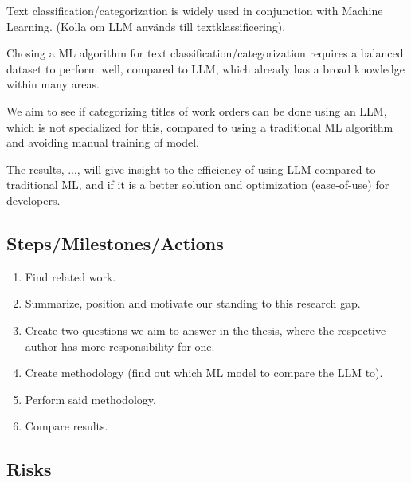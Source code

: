 \documentclass{article}
\begin{document}



Text classification/categorization is widely used in conjunction with Machine Learning.
(Kolla om LLM används till textklassificering).

Chosing a ML algorithm for text classification/categorization requires a balanced dataset to
perform well, compared to LLM, which already has a broad knowledge within many areas.

We aim to see if categorizing titles of work orders can be done using an LLM, which is not
specialized for this, compared to using a traditional ML algorithm and avoiding manual training
of model.

The results, ..., will give insight to the efficiency of using LLM compared to traditional ML,
and if it is a better solution and optimization (ease-of-use) for developers.

\subsection{Steps/Milestones/Actions}

\begin{enumerate}
      \item Find related work.
      \item Summarize, position and motivate our standing to this research gap.
      \item Create two questions we aim to answer in the thesis,
            where the respective author has more responsibility for one.
      \item Create methodology (find out which ML model to compare the LLM to).
      \item Perform said methodology.
      \item Compare results.
\end{enumerate}

\subsection{Risks}
\end{document}
